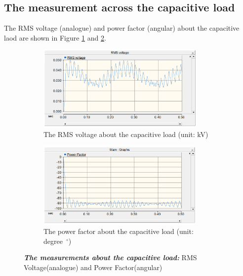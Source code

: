\documentclass[12pt]{report} %
\begin{document}
\subsection{The measurement across the capacitive load}
The RMS voltage (analogue) and power factor (angular) about the capacitive laod are shown in Figure \ref{fig:Q2C_RMS} and \ref{fig:Q2C_PF}. 
\begin{figure}[H]
    \centering %
    \begin{subfigure}[b]{\textwidth}
        \centering
        \includegraphics[width=0.9\textwidth]{Image/Q2/Q2_capacitor_RMS.PNG}
        \caption{The RMS voltage about the capacitive load (unit: kV)}
        \label{fig:Q2C_RMS}
    \end{subfigure}
    \hfill
    \centering %
    \begin{subfigure}[b]{\textwidth}
        \centering
        \includegraphics[width=0.9\textwidth]{Image/Q2/Q2_capacitor_PF.PNG}
        \caption{The power factor about the capacitive load (unit: degree~$^\circ$)}
        \label{fig:Q2C_PF}
    \end{subfigure} 
    \caption[The RMS voltage and power factor about the capacitive load ]
    {\centering \textit{\textbf{The measurements about the capacitive load:}} RMS Voltage(analogue) and Power Factor(angular)}
    \label{fig:Q2C}
\end{figure}
\newpage
\end{document}
